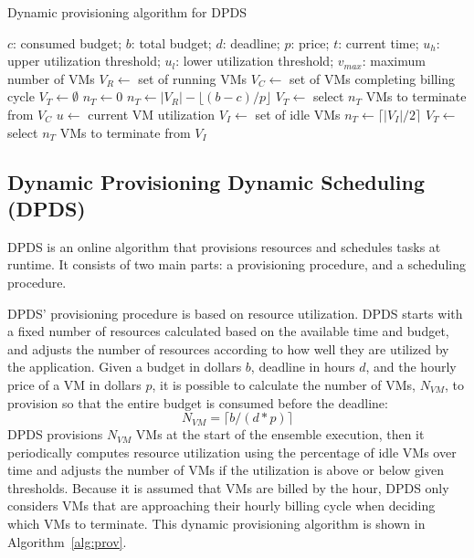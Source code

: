 \documentclass[conference]{IEEEtran}
\begin{document}
\begin{algorithm}[tb]
\caption{Dynamic provisioning algorithm for DPDS}
\label{alg:prov}
{\footnotesize
\begin{algorithmic}[1]
\Require $c$: consumed budget; $b$: total budget; $d$: deadline; $p$: price;
$t$: current time; $u_h$: upper utilization threshold; $u_l$: lower utilization
threshold; $v_{max}$: maximum number of VMs
  \State $V_R\gets$ set of running VMs
    \State $V_C\gets$ set of VMs completing billing cycle
    \State $V_T\gets \emptyset$ 
    \State $n_T\gets 0$ 
      \State $n_T\gets |V_R| - \lfloor(b-c)/p\rfloor$
      \State $V_T\gets$ select $n_T$ VMs to terminate from $V_C$
      \State {} \label{l:terminate1}
    \Else 
    \State $u\gets$ current VM utilization
        \State {}
        \State $V_I\gets$ set of idle VMs
        \State $n_T\gets \lceil|V_I|/2\rceil$ \label{l:nT2}
      \State $V_T\gets$ select $n_T$ VMs to terminate from $V_I$
        \State {} \label{l:terminate2}
      \EndIf 
    \EndIf
\EndProcedure
\end{algorithmic}}
\end{algorithm}

\subsection{Dynamic Provisioning Dynamic Scheduling (DPDS)}
\label{sec:dpds}

DPDS is an online algorithm that provisions resources and schedules tasks at
runtime. It consists of two main parts: a provisioning procedure, and a
scheduling procedure.

DPDS' provisioning procedure is based on resource utilization. DPDS starts with
a fixed number of resources calculated based on the available time and budget,
and adjusts the number of resources according to how well they are utilized by
the application.
Given a budget in dollars $b$, deadline in hours $d$, and the hourly price of a
VM in dollars $p$, it is possible to calculate the number of VMs, $N_{VM}$, to
provision so that the entire budget is consumed before the deadline:
%
\begin{equation}
\label{eq:static-plan}
N_{VM} = \lceil b / (d * p) \rceil
\end{equation}
%
DPDS provisions $N_{VM}$ VMs at the start of the ensemble execution, then it
periodically computes resource utilization using the percentage of idle VMs
over time and adjusts the number of VMs if the utilization is above or below
given thresholds. Because it is assumed that VMs are billed by the hour, DPDS
only considers VMs that are approaching their hourly billing cycle when
deciding which VMs to terminate. This dynamic provisioning algorithm is shown
in Algorithm~\ref{alg:prov}.
\end{document}
